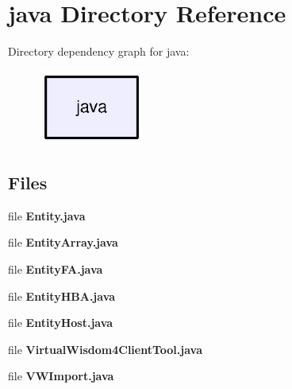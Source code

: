 \section{java Directory Reference}
\label{dir_93c6ba7fb77bae0709fae89c9c13b44a}
Directory dependency graph for java\+:\nopagebreak
\begin{figure}[H]
\begin{center}
\leavevmode
\includegraphics[width=98pt]{dir_93c6ba7fb77bae0709fae89c9c13b44a_dep}
\end{center}
\end{figure}
\subsection*{Files}
\begin{DoxyCompactItemize}
\item 
file {\bf Entity.\+java}
\item 
file {\bf Entity\+Array.\+java}
\item 
file {\bf Entity\+F\+A.\+java}
\item 
file {\bf Entity\+H\+B\+A.\+java}
\item 
file {\bf Entity\+Host.\+java}
\item 
file {\bf Virtual\+Wisdom4\+Client\+Tool.\+java}
\item 
file {\bf V\+W\+Import.\+java}
\end{DoxyCompactItemize}
